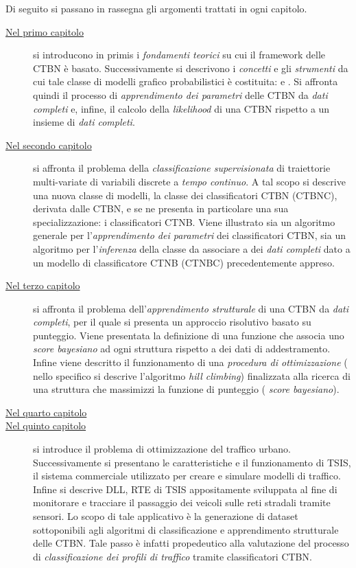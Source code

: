 Di seguito si passano in rassegna gli argomenti trattati in ogni capitolo.
\begin{description}
	\item[{\hyperref[cap:ctbn]{Nel primo capitolo}}]
	si introducono in primis i \emph{fondamenti teorici} su cui il framework delle \acf{CTBN} è basato. Successivamente si descrivono i \emph{concetti} e gli \emph{strumenti} da cui tale classe di modelli grafico probabilistici è costituita: \emph{\cim{}} e \emph{\stats{}}. Si affronta quindi il processo di \emph{apprendimento dei parametri} delle \acs{CTBN} da \emph{dati completi} e, infine, il calcolo della \emph{likelihood} di una \acs{CTBN} rispetto a un insieme di \emph{dati completi}.
	\item[{\hyperref[cap:ctbnc]{Nel secondo capitolo}}]
	si affronta il problema della \emph{classificazione supervisionata} di traiettorie multi-variate di variabili discrete a \emph{tempo continuo}. A tal scopo si descrive una nuova classe di modelli, la classe dei classificatori \acl{CTBN} (\acs{CTBNC}), derivata dalle \acs{CTBN}, e se ne presenta in particolare una sua specializzazione: i classificatori \acs{CTNB}. Viene illustrato sia un algoritmo generale per l'\emph{apprendimento dei parametri} dei classificatori \acs{CTBN}, sia un algoritmo per l'\emph{inferenza} della classe da associare a dei \emph{dati completi} dato a un modello di classificatore \acs{CTNB} (\acs{CTNBC}) precedentemente appreso.
	\item[{\hyperref[cap:structurallearning]{Nel terzo capitolo}}]
	si affronta il problema dell'\emph{apprendimento strutturale} di una \acs{CTBN} da \emph{dati completi}, per il quale si presenta un approccio risolutivo basato su punteggio. Viene presentata la definizione di una funzione che associa uno \emph{score bayesiano} ad ogni struttura rispetto a dei dati di addestramento. Infine viene descritto il funzionamento di una \emph{procedura di ottimizzazione} (\ie{} nello specifico si descrive l'algoritmo \emph{hill climbing}) finalizzata alla ricerca di una struttura che massimizzi la funzione di punteggio (\ie{} \emph{score bayesiano}).
	\item[{\hyperref[cap:ctbnr]{Nel quarto capitolo}}]
	\omissis{}
	\item[{\hyperref[cap:tsis-sensors]{Nel quinto capitolo}}]
	si introduce il problema di ottimizzazione del traffico urbano. Successivamente si presentano le caratteristiche e il funzionamento di \acf{TSIS}, il sistema commerciale utilizzato per creare e simulare modelli di traffico. Infine si descrive  \acs{DLL}, \acl{RTE} di \acs{TSIS} appositamente sviluppata al fine di monitorare e tracciare il passaggio dei veicoli sulle reti stradali tramite sensori. Lo scopo di tale applicativo è la generazione di dataset sottoponibili agli algoritmi di classificazione e apprendimento strutturale delle \acs{CTBN}. Tale passo è infatti propedeutico alla valutazione del processo di \emph{classificazione dei profili di traffico} tramite classificatori \acs{CTBN}.

\end{description}
